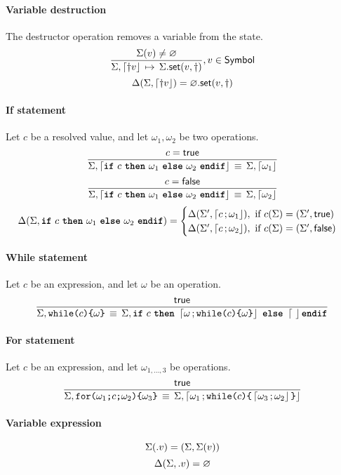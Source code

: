\paragraph{Variable destruction}
The destructor operation removes a variable from the state.
$$
\semrule
	{\Sigma(v) \neq \varnothing}
	{\Sigma, \stmt{\dagger v}}
	{\StSet{\Sigma}{v}{\dagger}},
		v \in \Symbol
$$
$$
\Delta(\Sigma, \stmt{\dagger v}) = \StSet{\varnothing}{v}{\dagger}
$$


\paragraph{If statement}
Let $c$ be a resolved value, and let $\omega_1, \omega_2$ be two operations.
$$
\semruleeq
	{c = \true}
	{\Sigma, \stmt{\ifstmt{c}{\omega_1}{\omega_2}}}
	{\Sigma, \stmt{\omega_1}}
$$
$$
\semruleeq
	{c = \false}
	{\Sigma, \stmt{\ifstmt{c}{\omega_1}{\omega_2}}}
	{\Sigma, \stmt{\omega_2}}
$$
$$
\Delta(\Sigma, \ifstmt{c}{\omega_1}{\omega_2}) =
\begin{cases}
  \Delta(\Sigma', \stmt{c}{\omega_1}), ~ \text{if } c(\Sigma) = (\Sigma', \true)\\
  \Delta(\Sigma', \stmt{c}{\omega_2}), ~ \text{if } c(\Sigma) = (\Sigma', \false)
\end{cases}
$$

\paragraph{While statement}
Let $c$ be an expression, and let $\omega$ be an operation.
$$
\semruleeq
       {\true}
       {\Sigma, \whilestmt{c}{\omega}}
       {\Sigma, \ifstmt{c}{\stmt{\omega}{\whilestmt{c}{\omega}}}{\stmt}}
$$

\paragraph{For statement}
Let $c$ be an expression, and let $\omega_{1,\ldots,3}$ be operations.
$$
\semruleeq
        {\true}
        {\Sigma, \forstmt{\omega_1}{c}{\omega_2}{\omega_3}}
        {\Sigma, \stmt{\omega_1}{\whilestmt{c}{\stmt{\omega_3}{\omega_2}}}}
$$

\paragraph{Variable expression}
$$
\Sigma({.}v) = (\Sigma, \Sigma(v))
$$
$$
\Delta(\Sigma, {.}v) = \varnothing
$$
